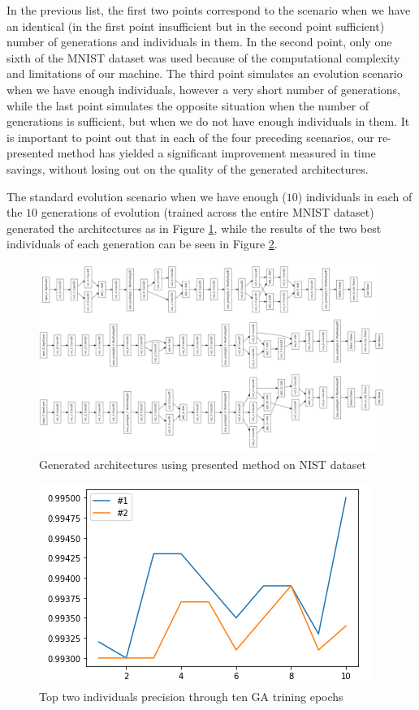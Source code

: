 \documentclass[eng]{simposium}
\begin{document}
In the previous list, the first two points correspond to the scenario when we have an identical 
(in the first point insufficient but in the second point sufficient) number of generations and individuals in them. 
In the second point, only one sixth of the MNIST dataset was used because of the computational complexity and limitations of our machine. 
The third point simulates an evolution scenario when we have enough individuals, however a very short number of generations, 
while the last point simulates the opposite situation when the number of generations is sufficient, but when we do not have 
enough individuals in them. 
It is important to point out that in each of the four preceding scenarios, our re-presented method has yielded a significant 
improvement measured in time savings, without losing out on the quality of the generated architectures. 

The standard evolution scenario when we have enough ($10$) individuals in each of the $10$ generations of evolution 
(trained across the entire MNIST dataset) generated the architectures as in Figure \ref{fig:architectures}, 
while the results of the two best individuals of each generation can be seen in Figure \ref{fig:top2}. 

\begin{figure}[!ht]
  \centering
  \includegraphics[width=1\textwidth]{arhitekture.png}
  \caption{Generated architectures using presented method on NIST dataset}
  \label{fig:architectures}
\end{figure}

\begin{figure}[!ht]
  \centering
  \includegraphics[]{top1.png}
  \caption{Top two individuals precision through ten GA trining epochs}
  \label{fig:top2}
\end{figure}
\end{document}
